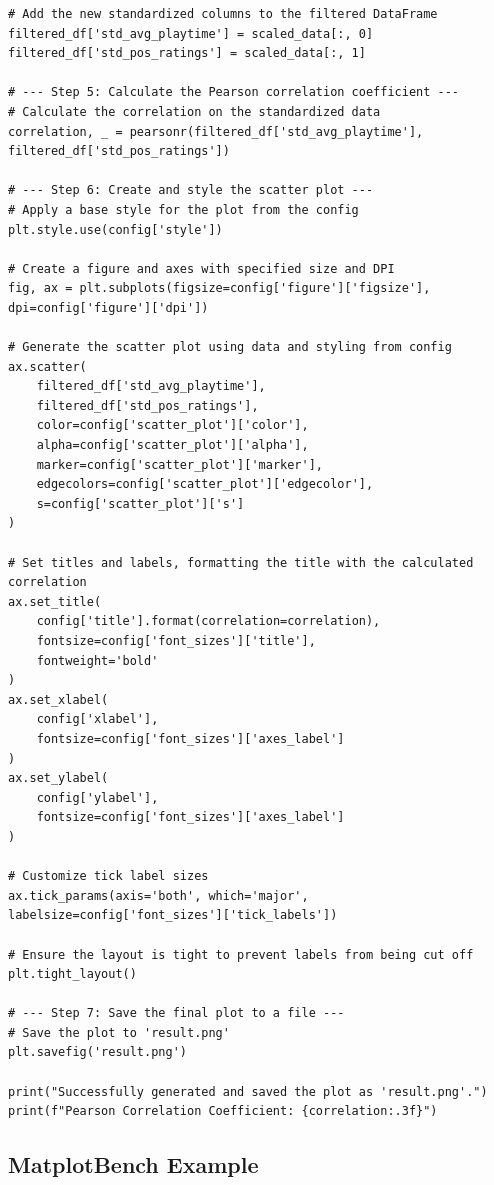 \documentclass[11pt, a4paper, logo, copyright]{googlecloud}
\begin{document}
\begin{verbatim}
# Add the new standardized columns to the filtered DataFrame
filtered_df['std_avg_playtime'] = scaled_data[:, 0]
filtered_df['std_pos_ratings'] = scaled_data[:, 1]

# --- Step 5: Calculate the Pearson correlation coefficient ---
# Calculate the correlation on the standardized data
correlation, _ = pearsonr(filtered_df['std_avg_playtime'], filtered_df['std_pos_ratings'])

# --- Step 6: Create and style the scatter plot ---
# Apply a base style for the plot from the config
plt.style.use(config['style'])

# Create a figure and axes with specified size and DPI
fig, ax = plt.subplots(figsize=config['figure']['figsize'], dpi=config['figure']['dpi'])

# Generate the scatter plot using data and styling from config
ax.scatter(
    filtered_df['std_avg_playtime'],
    filtered_df['std_pos_ratings'],
    color=config['scatter_plot']['color'],
    alpha=config['scatter_plot']['alpha'],
    marker=config['scatter_plot']['marker'],
    edgecolors=config['scatter_plot']['edgecolor'],
    s=config['scatter_plot']['s']
)

# Set titles and labels, formatting the title with the calculated correlation
ax.set_title(
    config['title'].format(correlation=correlation),
    fontsize=config['font_sizes']['title'],
    fontweight='bold'
)
ax.set_xlabel(
    config['xlabel'],
    fontsize=config['font_sizes']['axes_label']
)
ax.set_ylabel(
    config['ylabel'],
    fontsize=config['font_sizes']['axes_label']
)

# Customize tick label sizes
ax.tick_params(axis='both', which='major', labelsize=config['font_sizes']['tick_labels'])

# Ensure the layout is tight to prevent labels from being cut off
plt.tight_layout()

# --- Step 7: Save the final plot to a file ---
# Save the plot to 'result.png'
plt.savefig('result.png')

print("Successfully generated and saved the plot as 'result.png'.")
print(f"Pearson Correlation Coefficient: {correlation:.3f}")
\end{verbatim}


\subsection{MatplotBench Example}
\end{document}
